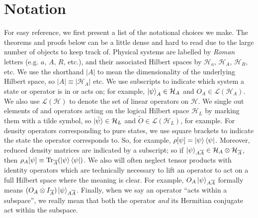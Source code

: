\documentclass[12pt,a4paper]{report}
\numberwithin{equation}{section}
\newcommand{\ketbra}[2]{\ket{#1}\bra{#2}}
\newcommand{\ketbras}[1]{\ketbra{#1}{#1}}
\newcommand{\ol}[1]{\overline{#1}}
\newcommand{\tr}{\text{Tr}}
\theoremstyle{definition}
\theoremstyle{theorem}
\theoremstyle{theorem}
\theoremstyle{example}
\theoremstyle{definition}
\begin{document}
\section{Notation}
For easy reference, we first present a list of the notational choices we make. The theorems and proofs below can be a little dense and hard to read due to the large number of objects to keep track of. Physical systems are labelled by \textit{Roman} letters (e.g. $a,\,A,\,R$, etc.), and their associated Hilbert spaces by $\mathcal{H}_{a},\,\mathcal{H}_{A},\,\mathcal{H}_{R}$, etc. We use the shorthand $|A|$ to mean the dimensionality of the underlying Hilbert space, so $|A|\equiv|\mathcal{H}_{A}|$ etc. We use subscripts to indicate which system a state or operator is in or acts on; for example, $\ket{\psi}_{A}\in\mathcal{H}_{A}$ and $O_{A}\in\mathcal{L}(\mathcal{H}_{A})$. We also use $\mathcal{L}(\mathcal{H})$ to denote the set of linear operators on $\mathcal{H}$. We single out elements of and operators acting on the logical Hilbert space $\mathcal{H}_{L}$ by marking them with a tilde symbol, so $\ket{\tilde{\psi}}\in\mathcal{H}_{L}$ and $\tilde{O}\in\mathcal{L}(\mathcal{H}_{L})$, for example. For density operators corresponding to pure states, we use square brackets to indicate the state the operator corresponds to. So, for example, $\rho[\psi]=\ketbras{\psi}$. Moreover, reduced density matrices are indicated by a subscript; so if $\ket{\psi}_{A\ol{A}}\in\mathcal{H}_{A}\otimes\mathcal{H}_{\ol{A}}$, then $\rho_{A}[\psi]\equiv\tr_{\ol{A}}(\ketbras{\psi})$. We also will often neglect tensor products with identity operators which are technically necessary to lift an operator to act on a full Hilbert space where the meaning is clear. For example, $O_{A}\ket{\psi}_{A\ol{A}}$ formally means $(O_{A}\otimes I_{\ol{A}})\ket{\psi}_{A\ol{A}}$. Finally, when we say an operator ``acts within a subspace'', we really mean that both the operator \textit{and} its Hermitian conjugate act within the subspace.
\end{document}
